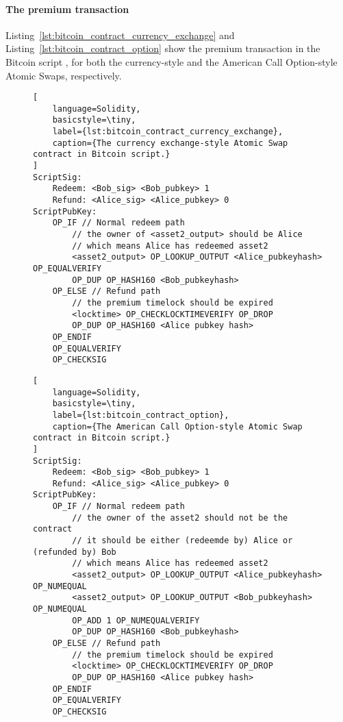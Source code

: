 \paragraph{The premium transaction}
Listing~\ref{lst:bitcoin_contract_currency_exchange} and Listing~\ref{lst:bitcoin_contract_option} show the premium transaction in the Bitcoin script
, for both the currency-style and the American Call Option-style Atomic Swaps, respectively.

\begin{figure}[htb]
\begin{lstlisting}[
    language=Solidity, 
    basicstyle=\tiny,
    label={lst:bitcoin_contract_currency_exchange},
    caption={The currency exchange-style Atomic Swap contract in Bitcoin script.}
]
ScriptSig:
    Redeem: <Bob_sig> <Bob_pubkey> 1
    Refund: <Alice_sig> <Alice_pubkey> 0
ScriptPubKey:
    OP_IF // Normal redeem path
        // the owner of <asset2_output> should be Alice
        // which means Alice has redeemed asset2
        <asset2_output> OP_LOOKUP_OUTPUT <Alice_pubkeyhash> OP_EQUALVERIFY 
        OP_DUP OP_HASH160 <Bob_pubkeyhash>
    OP_ELSE // Refund path
        // the premium timelock should be expired
        <locktime> OP_CHECKLOCKTIMEVERIFY OP_DROP
        OP_DUP OP_HASH160 <Alice pubkey hash>
    OP_ENDIF
    OP_EQUALVERIFY
    OP_CHECKSIG
\end{lstlisting}  
\end{figure}

\begin{figure}[htb]
\begin{lstlisting}[
    language=Solidity, 
    basicstyle=\tiny,
    label={lst:bitcoin_contract_option},
    caption={The American Call Option-style Atomic Swap contract in Bitcoin script.}
]
ScriptSig:
    Redeem: <Bob_sig> <Bob_pubkey> 1
    Refund: <Alice_sig> <Alice_pubkey> 0
ScriptPubKey:
    OP_IF // Normal redeem path
        // the owner of the asset2 should not be the contract
        // it should be either (redeemde by) Alice or (refunded by) Bob
        // which means Alice has redeemed asset2
        <asset2_output> OP_LOOKUP_OUTPUT <Alice_pubkeyhash> OP_NUMEQUAL
        <asset2_output> OP_LOOKUP_OUTPUT <Bob_pubkeyhash> OP_NUMEQUAL
        OP_ADD 1 OP_NUMEQUALVERIFY
        OP_DUP OP_HASH160 <Bob_pubkeyhash>
    OP_ELSE // Refund path
        // the premium timelock should be expired
        <locktime> OP_CHECKLOCKTIMEVERIFY OP_DROP
        OP_DUP OP_HASH160 <Alice pubkey hash>
    OP_ENDIF
    OP_EQUALVERIFY
    OP_CHECKSIG
\end{lstlisting}
\end{figure}

